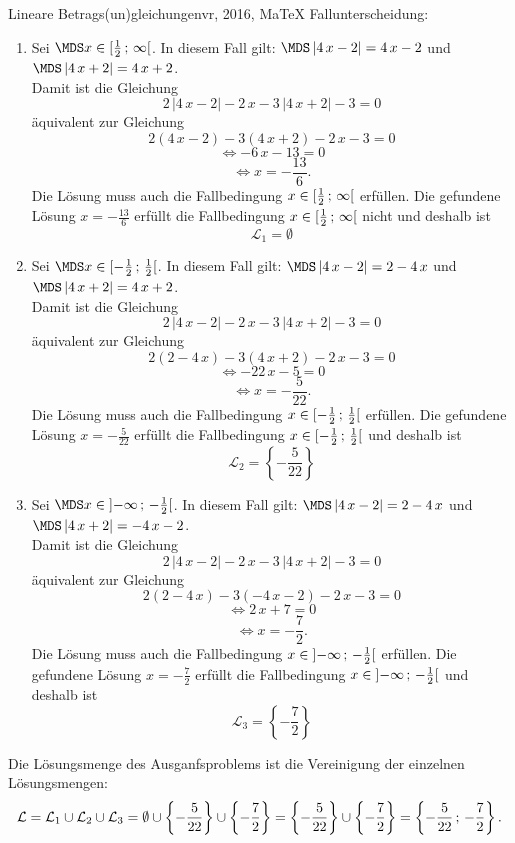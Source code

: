 \begin{MAufgabe}{Lineare Betrags(un)gleichungen}{vr, 2016, MaTeX}
 Fallunterscheidung: 

 \begin{enumerate} 
 \item Sei $ \MDS x\in[ \frac{1}{2} \, \MIntvlSep \, \infty\MoIr $. 
 In diesem Fall gilt: 
  $ \MDS \left| 4\, x - 2\right|=4\, x - 2$ und $ \MDS \left| 4\, x + 2\right|=4\, x + 2$. \\ 
 Damit ist die Gleichung 
 $$ 
2\, \left|4\, x - 2\right| - 2\, x - 3\, \left|4\, x + 2\right| - 3= 0
$$
 \"aquivalent zur Gleichung
 $$ 
2\left(4\, x - 2\right)-3\left( 4\, x + 2\right)- 2\, x-3= 0 
$$  
$$ 
 \Leftrightarrow  - 6\, x - 13= 0 
$$  
$$ \Leftrightarrow x = - \frac{13}{6} . 
 $$ 
 Die L\"osung muss auch die Fallbedingung $x\in [ \frac{1}{2} \, ; \, \infty[\mbox{}  $ erf\"ullen. Die gefundene L\"osung $x=- \frac{13}{6}$ erf\"ullt die Fallbedingung  $x\in [ \frac{1}{2} \, ; \, \infty[\mbox{} $ nicht und deshalb ist  $$
 \mathcal{L}_{1}=\emptyset 
 $$ 
\item Sei $ \MDS x\in[ - \frac{1}{2} \, \MIntvlSep \, \frac{1}{2}\MoIr $. 
 In diesem Fall gilt: 
  $ \MDS \left| 4\, x - 2\right|=2 - 4\, x$ und $ \MDS \left| 4\, x + 2\right|=4\, x + 2$. \\ 
 Damit ist die Gleichung 
 $$ 
2\, \left|4\, x - 2\right| - 2\, x - 3\, \left|4\, x + 2\right| - 3= 0
$$
 \"aquivalent zur Gleichung
 $$ 
2\left(2 - 4\, x\right)-3\left( 4\, x + 2\right)- 2\, x-3= 0 
$$  
$$ 
 \Leftrightarrow  - 22\, x - 5= 0 
$$  
$$ \Leftrightarrow x = - \frac{5}{22} . 
 $$ 
 Die L\"osung muss auch die Fallbedingung $x\in [ - \frac{1}{2} \, ; \, \frac{1}{2}[\mbox{}  $ erf\"ullen. Die gefundene L\"osung $x=- \frac{5}{22}$ erf\"ullt die Fallbedingung  $x\in [ - \frac{1}{2} \, ; \, \frac{1}{2}[\mbox{} $ und deshalb ist  $$
 \mathcal{L}_{2}=\left\{- \frac{5}{22}\right\}
 $$ 
\item Sei $ \MDS x\in\MoIl  -\infty \, \MIntvlSep \, - \frac{1}{2}\MoIr $. 
 In diesem Fall gilt: 
  $ \MDS \left| 4\, x - 2\right|=2 - 4\, x$ und $ \MDS \left| 4\, x + 2\right|= - 4\, x - 2$. \\ 
 Damit ist die Gleichung 
 $$ 
2\, \left|4\, x - 2\right| - 2\, x - 3\, \left|4\, x + 2\right| - 3= 0
$$
 \"aquivalent zur Gleichung
 $$ 
2\left(2 - 4\, x\right)-3\left(  - 4\, x - 2\right)- 2\, x-3= 0 
$$  
$$ 
 \Leftrightarrow 2\, x + 7= 0 
$$  
$$ \Leftrightarrow x = - \frac{7}{2} . 
 $$ 
 Die L\"osung muss auch die Fallbedingung $x\in \mbox{}]\mathopen{}  -\infty \, ; \, - \frac{1}{2}[\mbox{}  $ erf\"ullen. Die gefundene L\"osung $x=- \frac{7}{2}$ erf\"ullt die Fallbedingung  $x\in \mbox{}]\mathopen{}  -\infty \, ; \, - \frac{1}{2}[\mbox{} $ und deshalb ist  $$
 \mathcal{L}_{3}=\left\{- \frac{7}{2}\right\}
 $$ 
 \end{enumerate} 
  Die L\"osungsmenge des Ausganfsproblems ist die Vereinigung der einzelnen L\"osungsmengen: 
$$ \mathcal{L} = \mathcal{L}_{1} \cup \mathcal{L}_{2} \cup \mathcal{L}_{3} 
 = \emptyset\cup \left\{- \frac{5}{22}\right\}\cup \left\{- \frac{7}{2}\right\} 
  =\left\{- \frac{5}{22}\right\}\cup\left\{- \frac{7}{2}\right\} 
  = \left\{- \frac{5}{22}\, ; \,- \frac{7}{2}\right\} 
 . $$ 
 

\end{MAufgabe}
